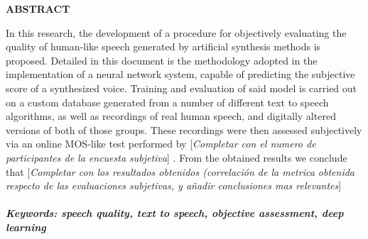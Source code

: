 \begin{center}
    \textbf{\LARGE{ABSTRACT}}
\end{center}

In this research, the development of a procedure for objectively evaluating the quality of human-like speech generated by artificial synthesis methods is proposed. Detailed in this document is the methodology adopted in the implementation of a neural network system, capable of predicting the subjective score of a synthesized voice. Training and evaluation of said model is carried out on a custom database generated from a number of different text to speech algorithms, as well as recordings of real human speech, and digitally altered versions of both of those groups. These recordings were then assessed subjectively via an online MOS-like test performed by \color{red} [\textit{Completar con el numero de participantes de la encuesta subjetiva}] \color{black}. From the obtained results we conclude that \color{red} [\textit{Completar con los resultados obtenidos (correlación de la metrica obtenida respecto de las evaluaciones subjetivas, y añadir conclusiones mas relevantes}] \color{black}
\\
\\
\footnotesize
\textbf{\textit{Keywords: speech quality, text to speech, objective assessment, deep learning}}
\normalsize
\newpage